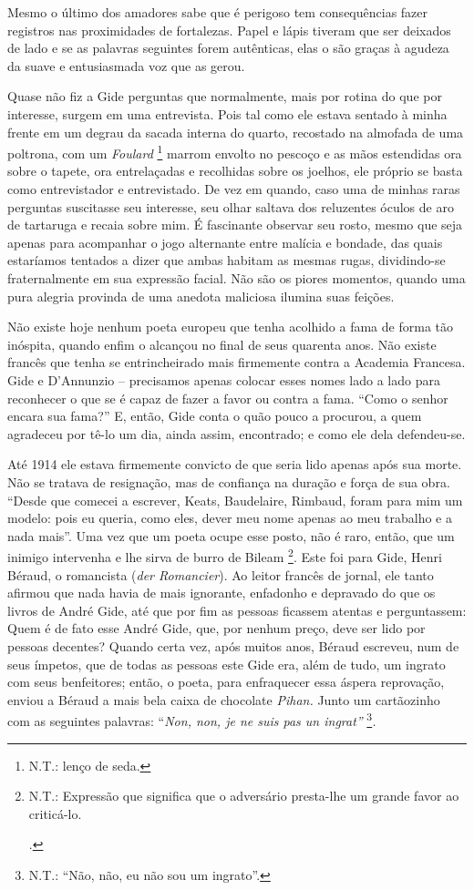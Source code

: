 Mesmo o último dos amadores sabe que é perigoso tem consequências fazer
registros nas proximidades de fortalezas. Papel e lápis tiveram que ser
deixados de lado e se as palavras seguintes forem autênticas, elas o são
graças à agudeza da suave e entusiasmada voz que as gerou.

Quase não fiz a Gide perguntas que normalmente, mais por rotina do que
por interesse, surgem em uma entrevista. Pois tal como ele estava
sentado à minha frente em um degrau da sacada interna do quarto,
recostado na almofada de uma poltrona, com um \emph{Foulard} \footnote{N.T.:
  lenço de seda.} marrom envolto no pescoço e as mãos estendidas ora
sobre o tapete, ora entrelaçadas e recolhidas sobre os joelhos, ele
próprio se basta como entrevistador e entrevistado\emph{.} De vez em
quando, caso uma de minhas raras perguntas suscitasse seu interesse, seu
olhar saltava dos reluzentes óculos de aro de tartaruga e recaia sobre
mim. É fascinante observar seu rosto, mesmo que seja apenas para
acompanhar o jogo alternante entre malícia e bondade, das quais
estaríamos tentados a dizer que ambas habitam as mesmas rugas,
dividindo-se fraternalmente em sua expressão facial. Não são os piores
momentos, quando uma pura alegria provinda de uma anedota maliciosa
ilumina suas feições.

Não existe hoje nenhum poeta europeu que tenha acolhido a fama de forma
tão inóspita, quando enfim o alcançou no final de seus quarenta anos.
Não existe francês que tenha se entrincheirado mais firmemente contra a
Academia Francesa. Gide e D'Annunzio -- precisamos apenas colocar esses
nomes lado a lado para reconhecer o que se é capaz de fazer a favor ou
contra a fama. ``Como o senhor encara sua fama?'' E, então, Gide conta o
quão pouco a procurou, a quem agradeceu por tê-lo um dia, ainda assim,
encontrado; e como ele dela defendeu-se.

Até 1914 ele estava firmemente convicto de que seria lido apenas após
sua morte. Não se tratava de resignação, mas de confiança na duração e
força de sua obra. ``Desde que comecei a escrever, Keats, Baudelaire,
Rimbaud, foram para mim um modelo: pois eu queria, como eles, dever meu
nome apenas ao meu trabalho e a nada mais''. Uma vez que um poeta ocupe
esse posto, não é raro, então, que um inimigo intervenha e lhe sirva de
burro de Bileam \footnote{N.T.: Expressão que significa que o adversário
  presta-lhe um grande favor ao criticá-lo.

  .}. Este foi para Gide, Henri Béraud, o romancista (\emph{der
Romancier}). Ao leitor francês de jornal, ele tanto afirmou que nada
havia de mais ignorante, enfadonho e depravado do que os livros de André
Gide, até que por fim as pessoas ficassem atentas e perguntassem: Quem é
de fato esse André Gide, que, por nenhum preço, deve ser lido por
pessoas decentes? Quando certa vez, após muitos anos, Béraud escreveu,
num de seus ímpetos, que de todas as pessoas este Gide era, além de
tudo, um ingrato com seus benfeitores; então, o poeta, para enfraquecer
essa áspera reprovação, enviou a Béraud a mais bela caixa de chocolate
\emph{Pihan.} Junto um cartãozinho com as seguintes palavras:
``\emph{Non, non, je ne suis pas un ingrat''} \footnote{N.T.: ``Não,
  não, eu não sou um ingrato''.}\emph{. }


